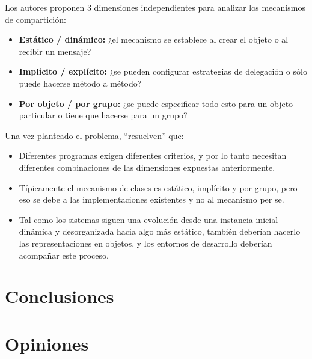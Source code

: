 \documentclass[a4paper,10pt]{article}
\newcommand{\strongitem}[1]{\item \textbf{#1:}}
\begin{document}
Los autores proponen 3 dimensiones independientes para analizar los mecanismos de compartición:
\begin{itemize}
	\strongitem{Estático / dinámico} ¿el mecanismo se establece al crear el objeto o al recibir un mensaje?
	\strongitem{Implícito / explícito} ¿se pueden configurar estrategias de delegación o sólo puede hacerse método a método?
	\strongitem{Por objeto / por grupo} ¿se puede especificar todo esto para un objeto particular o tiene que hacerse para un grupo?
\end{itemize}

Una vez planteado el problema, ``resuelven'' que:
\begin{itemize}
	\item Diferentes programas exigen diferentes criterios, y por lo tanto necesitan diferentes combinaciones de las dimensiones expuestas anteriormente.
	\item Típicamente el mecanismo de clases es estático, implícito y por grupo, pero eso se debe a las implementaciones existentes y no al mecanismo per se.
	\item Tal como los sistemas siguen una evolución desde una instancia inicial dinámica y desorganizada hacia algo más estático, también deberían hacerlo las representaciones en objetos, y los entornos de desarrollo deberían acompañar este proceso.
\end{itemize}

\section{Conclusiones}

\section{Opiniones}

\printbibliography
\end{document}
